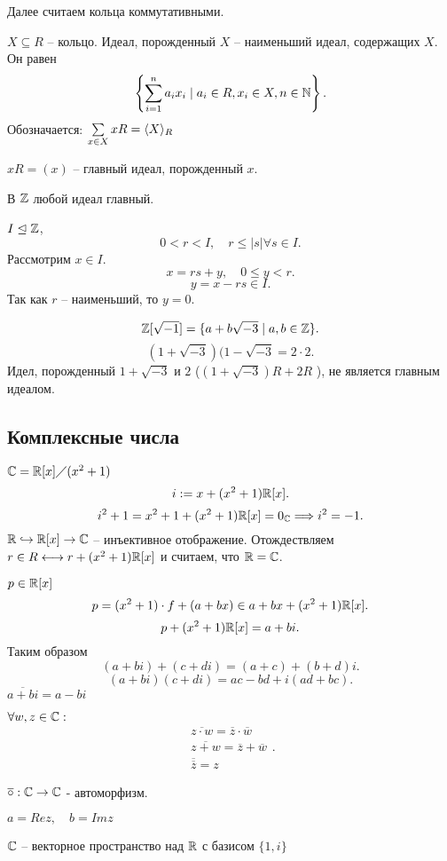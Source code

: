 \documentclass[12pt]{report}
\begin{document}
 \begin{note}
    Далее считаем кольца коммутативными.
\end{note}
\begin{defn}
$X \subseteq R$  -- кольцо.
Идеал, порожденный $X$  -- наименьший идеал, содержащих $X$. Он равен \[
    \left\{\sum\limits_{i=1}^{n}a_ix_i \mid a_i \in  R, x_i \in  X, n \in \mathbb{N}\right\}
.\] 
Обозначается: $\sum\limits_{x \in  X} x R = \langle X \rangle_R$

$xR = (x)$ -- главный идеал, порожденный $x$.
\end{defn}
\begin{ex}
    В $\mathbb{Z}$ любой идеал главный.

    $I \trianglelefteq \mathbb{Z}$,  \[
    0 < r< I, \quad r \le |s| \forall s \in I
    .\] 
    Рассмотрим  $x \in  I$.
    \[
    x = rs + y, \quad 0 \le y < r
    .\] 
    \[
    y = x - rs \in  I
    .\] 
    Так как $r$  -- наименьший, то $y=0$.
\end{ex}
\begin{ex}
    \[
	\mathbb{Z} [ \sqrt{-1}] = \{a + b\sqrt{-3} \mid a, b \in  \mathbb{Z}\}
    .\] 
    \[
	(1 + \sqrt{-3} )(1 - \sqrt{-3} = 2 \cdot 2
    .\] 
    Идел, порожденный $1+\sqrt{-3}$ и $2$ ($(1 + \sqrt{-3}) R + 2 R $ ), не является главным идеалом. 
\end{ex}
\subsection{Комплексные числа}
    $\mathbb{C} = \mathbb{R}[x]\diagup (x^2+1)$
    \[
	i := x + (x^2+1) \mathbb{R}[x]
    .\] 
    \[
	i^2+1 = x^2 + 1 + (x^2+1)\mathbb{R}[x] = 0_{\mathbb{C}} \Longrightarrow i^2 = -1
    .\] 
    $\mathbb{R} \hookrightarrow \mathbb{R}[x] \to \mathbb{C}$ -- инъективное отображение.   
    Отождествляем $r \in  R \longleftrightarrow r + (x^2+1) \mathbb{R}[x]$ и считаем, что $\mathbb{R} = \mathbb{C}$.

   $p \in  \mathbb{R}[x]$
   \[
       p = (x^2 + 1) \cdot f + (a + b x) \in  a + bx + (x^2 + 1)\mathbb{R}[x]
   .\] 
   \[
       p + (x^2+1) \mathbb{R}[x] = a + bi
   .\] 
   Таким образом \[
       (a + bi) + (c + di) = (a+c)+ (b+d)i
   .\] 
   \[
       (a + bi)(c + di) = ac - bd + i (ad+bc)
   .\] 
  $\overline{a+ bi} = a-bi $

   $ \forall  w, z \in  \mathbb{C}:$
   \[
       \begin{array}{c}
	   \overline{z\cdot w} = \overline{z} \cdot \overline{w}\\
	   \overline{z + w} = \overline{z} + \overline{w}\\
	   \overline{\overline{z}} = z
       \end{array}
   .\] 

   $\overline{\circ} :\mathbb{C} \to  \mathbb{C}$  - автоморфизм.

   $a = Re z, \quad b = Im z$
   
   $\mathbb{C}$ -- векторное пространство над $\mathbb{R}$ с базисом $\{1, i\}$
\end{document}

